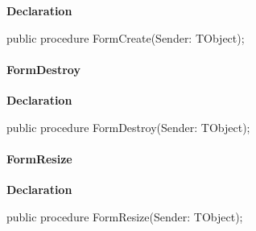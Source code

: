\documentclass{report}
\newif\ifpdf
\begin{document}
\label{manager.TMnFrm-FormCreate}
\begin{list}{}{
\setlength{\itemindent}{0cm}
\setlength{\listparindent}{0cm}
\setlength{\leftmargin}{\evensidemargin}
\addtolength{\leftmargin}{\tmplength}
\settowidth{\labelsep}{X}
\addtolength{\leftmargin}{\labelsep}
\setlength{\labelwidth}{\tmplength}
}
\item[\textbf{Declaration}\hfill]
\ifpdf
\begin{flushleft}
\fi
\begin{ttfamily}
public procedure FormCreate(Sender: TObject);\end{ttfamily}

\ifpdf
\end{flushleft}
\fi

\end{list}
\paragraph*{FormDestroy}\hspace*{\fill}

\label{manager.TMnFrm-FormDestroy}
\begin{list}{}{
\setlength{\itemindent}{0cm}
\setlength{\listparindent}{0cm}
\setlength{\leftmargin}{\evensidemargin}
\addtolength{\leftmargin}{\tmplength}
\settowidth{\labelsep}{X}
\addtolength{\leftmargin}{\labelsep}
\setlength{\labelwidth}{\tmplength}
}
\item[\textbf{Declaration}\hfill]
\ifpdf
\begin{flushleft}
\fi
\begin{ttfamily}
public procedure FormDestroy(Sender: TObject);\end{ttfamily}

\ifpdf
\end{flushleft}
\fi

\end{list}
\paragraph*{FormResize}\hspace*{\fill}

\label{manager.TMnFrm-FormResize}
\begin{list}{}{
\setlength{\itemindent}{0cm}
\setlength{\listparindent}{0cm}
\setlength{\leftmargin}{\evensidemargin}
\addtolength{\leftmargin}{\tmplength}
\settowidth{\labelsep}{X}
\addtolength{\leftmargin}{\labelsep}
\setlength{\labelwidth}{\tmplength}
}
\item[\textbf{Declaration}\hfill]
\ifpdf
\begin{flushleft}
\fi
\begin{ttfamily}
public procedure FormResize(Sender: TObject);\end{ttfamily}

\ifpdf
\end{flushleft}
\fi

\end{list}
\end{document}
